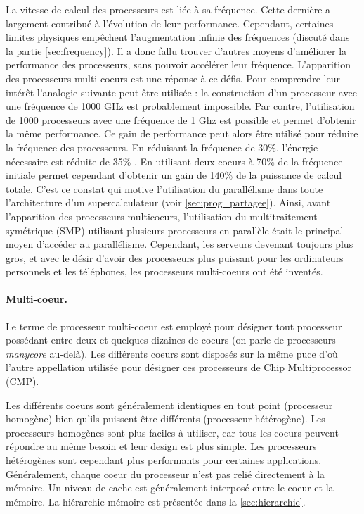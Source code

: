            La vitesse de calcul des processeurs est liée à sa fréquence. Cette dernière a largement contribué à l'évolution de leur performance. Cependant, certaines limites physiques empêchent l'augmentation infinie des fréquences (discuté dans la partie \ref{sec:frequency}). Il a donc fallu trouver d'autres moyens d'améliorer la performance des processeurs, sans pouvoir accélérer leur fréquence. L'apparition des processeurs multi-coeurs est une réponse à ce défis. Pour comprendre leur intérêt l'analogie suivante peut être utilisée \cite{tanenbaum2016structured}: la construction d'un processeur avec une fréquence de 1000 GHz est probablement impossible. Par contre, l'utilisation de 1000 processeurs avec une fréquence de 1 Ghz est possible et permet d'obtenir la même performance. Ce gain de performance peut alors être utilisé pour réduire la fréquence des processeurs. En réduisant la fréquence de 30\%, l'énergie nécessaire est réduite de 35\% \cite{mattsson2014haven}. En utilisant deux coeurs à 70\% de la fréquence initiale permet cependant d'obtenir un gain de 140\% de la puissance de calcul totale. C'est ce constat qui motive l'utilisation du parallélisme dans toute l'architecture d'un supercalculateur (voir \autoref{sec:prog_partagee}). Ainsi, avant l'apparition des processeurs multicoeurs, l'utilisation du multitraitement symétrique (SMP) utilisant plusieurs processeurs en parallèle était le principal moyen d'accéder au parallélisme. Cependant, les serveurs devenant toujours plus gros, et avec le désir d'avoir des processeurs plus puissant pour les ordinateurs personnels et les téléphones, les processeurs multi-coeurs ont été inventés.
        
        
        \paragraph{Multi-coeur.}
        
            Le terme de processeur multi-coeur est employé pour désigner tout processeur possédant entre deux et quelques dizaines de coeurs (on parle de processeurs \textit{manycore} au-delà). Les différents coeurs sont disposés sur la même puce d'où l'autre appellation utilisée pour désigner ces processeurs de Chip Multiprocessor (CMP).
            
            Les différents coeurs sont généralement identiques en tout point (processeur homogène) bien qu'ils puissent être différents (processeur hétérogène). Les processeurs homogènes sont plus faciles à utiliser, car tous les coeurs peuvent répondre au même besoin et leur design est plus simple. Les processeurs hétérogènes sont cependant plus performants pour certaines applications. 
            Généralement, chaque coeur du processeur n'est pas relié directement à la mémoire. Un niveau de cache est généralement interposé entre le coeur et la mémoire. La hiérarchie mémoire est présentée dans la \autoref{sec:hierarchie}.
            
